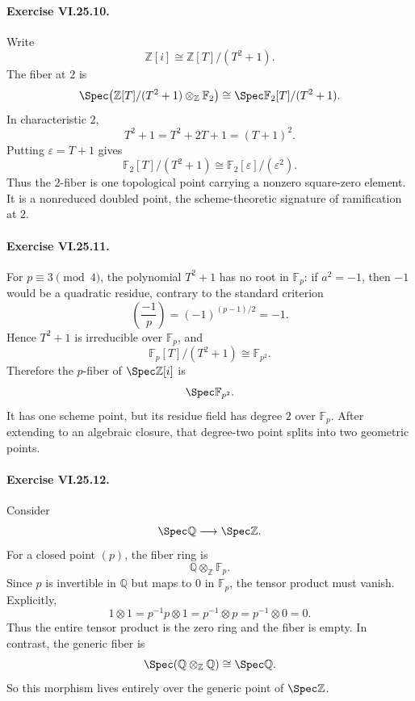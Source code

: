 \paragraph{Exercise VI.25.10.}
\begin{solution}
Write
\[
\mathbb Z[i]\cong\mathbb Z[T]/(T^2+1).
\]
The fiber at \(2\) is
\[
\Spec\!\left(\mathbb Z[T]/(T^2+1)\otimes_{\mathbb Z}\mathbb F_2\right)
\cong
\Spec\mathbb F_2[T]/(T^2+1).
\]
In characteristic \(2\),
\[
T^2+1=T^2+2T+1=(T+1)^2.
\]
Putting \(\varepsilon=T+1\) gives
\[
\mathbb F_2[T]/(T^2+1)\cong\mathbb F_2[\varepsilon]/(\varepsilon^2).
\]
Thus the \(2\)-fiber is one topological point carrying a nonzero square-zero element.  It is a nonreduced doubled point, the scheme-theoretic signature of ramification at \(2\).
\end{solution}

\paragraph{Exercise VI.25.11.}
\begin{solution}
For \(p\equiv3\pmod4\), the polynomial \(T^2+1\) has no root in \(\mathbb F_p\): if \(a^2=-1\), then \(-1\) would be a quadratic residue, contrary to the standard criterion
\[
\left(\frac{-1}{p}\right)=(-1)^{(p-1)/2}=-1.
\]
Hence \(T^2+1\) is irreducible over \(\mathbb F_p\), and
\[
\mathbb F_p[T]/(T^2+1)\cong\mathbb F_{p^2}.
\]
Therefore the \(p\)-fiber of \(\Spec\mathbb Z[i]\) is
\[
\Spec\mathbb F_{p^2}.
\]
It has one scheme point, but its residue field has degree \(2\) over \(\mathbb F_p\).  After extending to an algebraic closure, that degree-two point splits into two geometric points.
\end{solution}

\paragraph{Exercise VI.25.12.}
\begin{solution}
Consider
\[
\Spec\mathbb Q\longrightarrow\Spec\mathbb Z.
\]
For a closed point \((p)\), the fiber ring is
\[
\mathbb Q\otimes_{\mathbb Z}\mathbb F_p.
\]
Since \(p\) is invertible in \(\mathbb Q\) but maps to \(0\) in \(\mathbb F_p\), the tensor product must vanish.  Explicitly,
\[
1\otimes1
=
p^{-1}p\otimes1
=
p^{-1}\otimes p
=
p^{-1}\otimes0
=
0.
\]
Thus the entire tensor product is the zero ring and the fiber is empty.  In contrast, the generic fiber is
\[
\Spec(\mathbb Q\otimes_{\mathbb Z}\mathbb Q)\cong\Spec\mathbb Q.
\]
So this morphism lives entirely over the generic point of \(\Spec\mathbb Z\).
\end{solution}

